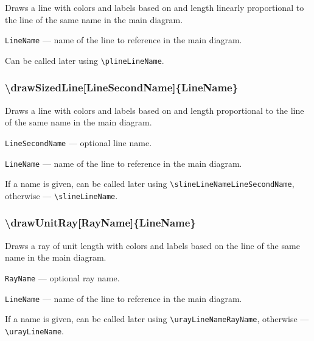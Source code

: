 \documentclass{ltxdoc}
\begin{document}
	Draws a line with colors and labels based on and length linearly proportional to the line of the same name in the main diagram.

	\texttt{LineName} — name of the line to reference in the main diagram. 
	
	Can be called later using \texttt{\textbackslash plineLineName}.


\subsubsection{\textbackslash drawSizedLine[LineSecondName]\{LineName\}}

	Draws a line with colors and labels based on and length proportional to the line of the same name in the main diagram.

	\texttt{LineSecondName} — optional line name. 
	
	\texttt{LineName} — name of the line to reference in the main diagram. 
	
	If a name is given, can be called later using \texttt{\textbackslash slineLineNameLineSecondName}, otherwise — \texttt{\textbackslash slineLineName}. 

\subsubsection{\textbackslash drawUnitRay[RayName]\{LineName\}}

	Draws a ray of unit length with colors and labels based on the line of the same name in the main diagram.

	\texttt{RayName} — optional ray name.
	
	\texttt{LineName} — name of the line to reference in the main diagram. 

	If a name is given, can be called later using \texttt{\textbackslash urayLineNameRayName}, otherwise — \texttt{\textbackslash urayLineName}. 



	
\end{document}
